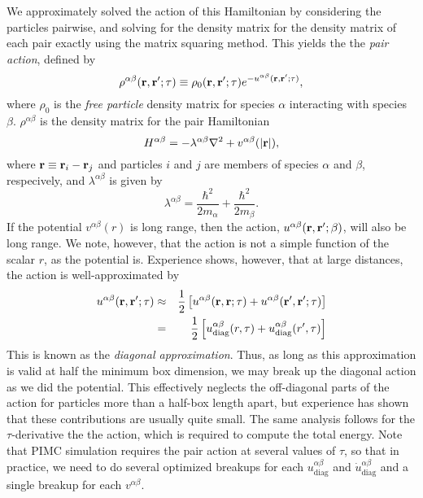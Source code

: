 \documentclass{article}
\begin{document}
We approximately solved the action of this Hamiltonian by considering
the particles pairwise, and solving for the density matrix for the
density matrix of each pair exactly using the matrix squaring method.
This yields the the {\em pair action}, defined by
\begin{equation}
\rho^{\alpha \beta}(\mathbf{r}, \mathbf{r}';\tau) \equiv \rho_0(\mathbf{r}, \mathbf{r}';\tau)
e^{-u^{\alpha \beta}(\mathbf{r}, \mathbf{r}';\tau)},
\end{equation}
where $\rho_0$ is the {\em free particle} density matrix for species
$\alpha$ interacting with species $\beta$.  $\rho^{\alpha \beta}$ is
the density matrix for the pair Hamiltonian
\begin{equation}
H^{\alpha\beta} = -\lambda^{\alpha\beta} \nabla^2 + v^{\alpha\beta}(|\mathbf{r}|),
\end{equation}
where $\mathbf{r} \equiv \mathbf{r}_i - \mathbf{r}_j$ and particles $i$ and $j$ are members
of species $\alpha$ and $\beta$, respecively, and
$\lambda^{\alpha\beta}$ is given by
\begin{equation}
\lambda^{\alpha \beta} = \frac{\hbar^2}{2m_{\alpha}} +
\frac{\hbar^2}{2m_\beta}.
\end{equation}
If the potential $v^{\alpha \beta}(r)$ is long range, then the action,
$u^{\alpha \beta}(\mathbf{r}, \mathbf{r}';\beta)$, will also be long range.  We
note, however, that the action is not a simple function of the scalar
$r$, as the potential is.  Experience shows, however, that at large
distances, the action is well-approximated by
\begin{eqnarray}
u^{\alpha\beta}(\mathbf{r}, \mathbf{r}';\tau) & \approx & 
\frac{1}{2} \left[ u^{\alpha\beta}(\mathbf{r},\mathbf{r};\tau) +
  u^{\alpha\beta}(\mathbf{r}',\mathbf{r}';\tau)\right] \\
& = & \frac{1}{2} \left[ u^{\alpha\beta}_\text{diag}(r,\tau)+
u^{\alpha\beta}_\text{diag}(r',\tau)\right]
\end{eqnarray}
This is known as the {\em diagonal approximation}.  Thus, as long as
this approximation is valid at half the minimum box dimension, we may
break up the diagonal action as we did the potential.  This
effectively neglects the off-diagonal parts of the action for
particles more than a half-box length apart, but experience has shown
that these contributions are usually quite small.  The same
analysis follows for the $\tau$-derivative the the action, which is
required to compute the total energy.  Note that PIMC simulation
requires the pair action at several values of $\tau$, so that in
practice, we need to do several optimized breakups for each
$u_\text{diag}^{\alpha\beta}$ and $\dot{u}_\text{diag}^{\alpha\beta}$ and a single breakup for
each $v^{\alpha\beta}$.
\end{document}
